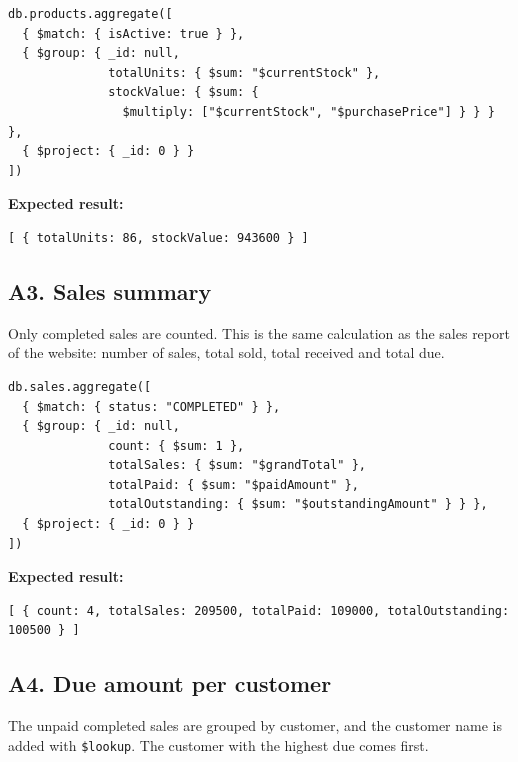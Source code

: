 \documentclass[11pt,a4paper]{article}
\newcommand{\code}[1]{\texttt{#1}}
\begin{document}
\begin{minipage}{\linewidth}
\begin{lstlisting}[style=query]
db.products.aggregate([
  { $match: { isActive: true } },
  { $group: { _id: null,
              totalUnits: { $sum: "$currentStock" },
              stockValue: { $sum: {
                $multiply: ["$currentStock", "$purchasePrice"] } } } },
  { $project: { _id: 0 } }
])
\end{lstlisting}
\end{minipage}

\noindent\textbf{Expected result:}
\begin{lstlisting}[style=result]
[ { totalUnits: 86, stockValue: 943600 } ]
\end{lstlisting}

\subsection*{A3. Sales summary}
Only completed sales are counted. This is the same calculation as the sales report of the website: number of sales, total sold, total received and total due.

\begin{minipage}{\linewidth}
\begin{lstlisting}[style=query]
db.sales.aggregate([
  { $match: { status: "COMPLETED" } },
  { $group: { _id: null,
              count: { $sum: 1 },
              totalSales: { $sum: "$grandTotal" },
              totalPaid: { $sum: "$paidAmount" },
              totalOutstanding: { $sum: "$outstandingAmount" } } },
  { $project: { _id: 0 } }
])
\end{lstlisting}
\end{minipage}

\noindent\textbf{Expected result:}
\begin{lstlisting}[style=result]
[ { count: 4, totalSales: 209500, totalPaid: 109000, totalOutstanding: 100500 } ]
\end{lstlisting}

\subsection*{A4. Due amount per customer}
The unpaid completed sales are grouped by customer, and the customer name is added with \code{\$lookup}. The customer with the highest due comes first.
\end{document}
